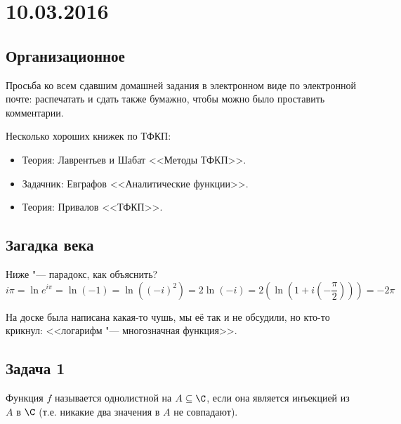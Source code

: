 \chapter{10.03.2016}

\section{Организационное}
	Просьба ко всем сдавшим домашней задания в электронном виде по электронной почте:
	распечатать и сдать также бумажно, чтобы можно было проставить комментарии.

	Несколько хороших книжек по ТФКП:
	\begin{itemize}
		\item Теория: Лаврентьев и Шабат <<Методы ТФКП>>.
		\item Задачник: Евграфов <<Аналитические функции>>.
		\item Теория: Привалов <<ТФКП>>.
	\end{itemize}

\section{Загадка века}
	Ниже "--- парадокс, как объяснить?
	\[
		i \pi =
		\ln e^{i\pi} =
		\ln (-1) =
		\ln ((-i)^2) =
		2\ln (-i) =
		2\left(\ln \left(1 + i\left(-\frac{\pi}{2}\right)\right)\right) =
		-2\pi
	\]
	\begin{Rem}
		На доске была написана какая-то чушь, мы её так и не обсудили,
		но кто-то крикнул: <<логарифм "--- многозначная функция>>.
	\end{Rem}

\section{Задача 1}
	\begin{Def}
		Функция $f$ называется однолистной на $A \subseteq \C$, если
		она является инъекцией из $A$ в $\C$ (т.е. никакие два значения в $A$ не совпадают).
	\end{Def}

